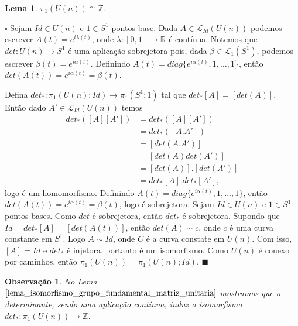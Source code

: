 \documentclass[12pt]{book}
\newtheorem{lema}[teorema]{Lema}
\newtheorem{observacao}[teorema]{Observação}
\newenvironment{prova}[1]{$\square$ #1}{\hfill$\blacksquare$}
\newcommand{\caminhos}{\mathcal{L}}
\newcommand{\caminhospontobasegeral}[2]{\caminhos_{#1}(#2)}
\newcommand{\circulo}{S^{1}}
\newcommand{\classe}[1]{[#1]}
\newcommand{\grupofundamental}[1]{\pi_{1}(#1)}
\newcommand{\grupofundamentalpontobase}[2]{\pi_{1}(#1; #2)}
\newcommand{\inteiros}{\mathbb{Z}}
\newcommand{\matrizunitaria}[1]{U(#1)}
\newcommand{\real}[1]{\mathbb{R}^{#1}}
\newcommand{\reta}{\real{}}
\begin{document}
	\begin{lema}\label{lema_isomorfismo_grupo_fundamental_matriz_unitaria}
		$\grupofundamental{\matrizunitaria{n}} \cong \inteiros$.
	\end{lema}
	\begin{prova}
		Sejam $Id \in \matrizunitaria{n}$ e $1 \in \circulo$ pontos base. Dada $A\in \caminhospontobasegeral{Id}{\matrizunitaria{n}}$ podemos escrever $A(t) = e^{i\lambda(t)}$,  onde $\lambda:[0,1 ]\to \reta$ é contínua. Notemos que $det:\matrizunitaria{n} \to \circulo$ é uma aplicação sobrejetora pois, dada $\beta \in \caminhospontobasegeral{1}{\circulo}$, podemos escrever $\beta(t) = e^{i\alpha(t)}$. Definindo $A(t) = diag\{e^{i\alpha(t)}, 1, \dots, 1\}$, então $det(A(t)) =e^{i\alpha(t)}=\beta(t)$.
		
		Defina $det_{*}: \grupofundamentalpontobase{\matrizunitaria{n}}{Id} \to \grupofundamentalpontobase{\circulo}{1}$ tal que $det_{*}\classe{A} = \classe{det(A)}$. Então dado $A' \in \caminhospontobasegeral{Id}{\matrizunitaria{n}}$ temos 
		$$
		\begin{aligned}
		det_{*}(\classe{A}\classe{A'}) 
		&= det_{*}(\classe{A}\classe{A'}) 
		\\
		&= det_{*}(\classe{A.A'}) 
		\\
		&=\classe{det(A.A')}
		\\
		&=\classe{det(A)det(A')}
		\\
		&=\classe{det(A)}.\classe{det(A')}
		\\
		&=det_{*}\classe{A}.det_{*}\classe{A'},  
		\end{aligned}
		$$
		logo é um homomorfismo. Definindo $A(t) = diag\{e^{i\alpha(t)}, 1, \dots, 1\}$, então $det(A(t)) = e^{i\alpha(t)} = \beta(t)$, logo é sobrejetora. Sejam $Id \in \matrizunitaria{n}$ e $ 1 \in \circulo$ pontos bases. Como $det$ é sobrejetora, então $det_{*}$ é sobrejetora. Supondo que $Id = det_{*}\classe{A} = \classe{det(A(t))}$, então $det(A) \sim c$, onde $c$ é uma curva constante em $\circulo$. Logo $A \sim Id $, onde $C$ é a curva constate em $\matrizunitaria{n}$. Com isso, $\classe{A} = Id$ e $det_{*}$ é injetora, portanto é um isomorfismo.
		Como $\matrizunitaria{n}$ é conexo por caminhos, então $\grupofundamental{\matrizunitaria{n}} = \grupofundamentalpontobase{\matrizunitaria{n}}{Id}$.
	\end{prova}
	
	\begin{observacao}\label{observacao_determinante_homomorfismo}
		No Lema $\ref{lema_isomorfismo_grupo_fundamental_matriz_unitaria}$ mostramos que o determinante, sendo uma aplicação contínua, induz o isomorfismo $det_{*}: \grupofundamental{\matrizunitaria{n}} \to \inteiros$.
	\end{observacao}
	
\end{document}
